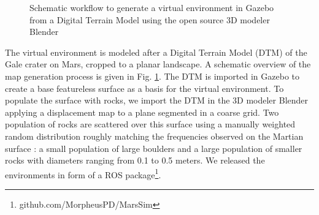 \documentclass[conference]{IEEEtran}  %
\begin{document}
\begin{figure}[t]
	\caption{Schematic workflow to generate a virtual environment in Gazebo from a Digital Terrain Model using the open source 3D modeler Blender}
	\label{fig::terrain::overview}
\end{figure}
\renewcommand{\sfdefault}{phv}

The virtual environment is modeled after a Digital Terrain Model (DTM) of the Gale crater on Mars, cropped to a planar landscape. A schematic overview of the map generation process is given in Fig. \ref{fig::terrain::overview}.
The DTM is imported in Gazebo to create a base featureless surface as a basis for the virtual environment. To populate the surface with rocks, we import the DTM in the 3D modeler Blender applying a displacement map to a plane segmented in a coarse grid.
Two population of rocks are scattered over this surface using a manually weighted random distribution roughly matching the frequencies observed on the Martian surface \cite{golombek2003rock}:
a small population of large boulders and a
large population of smaller rocks with diameters ranging from 0.1 to 0.5 meters.
We released the environments in form of a ROS package\footnote{github.com/MorpheusPD/MarsSim}.
\end{document}
